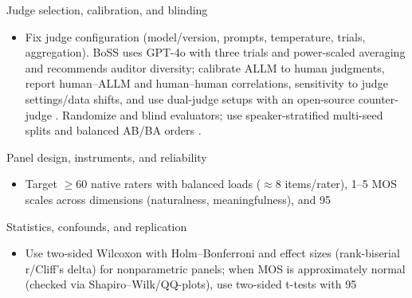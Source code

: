 \documentclass{article}
\begin{document}
Judge selection, calibration, and blinding
\begin{itemize}
  \item Fix judge configuration (model/version, prompts, temperature, trials, aggregation). BoSS uses GPT-4o with three trials and power-scaled averaging and recommends auditor diversity; calibrate ALLM to human judgments, report human--ALLM and human--human correlations, sensitivity to judge settings/data shifts, and use dual-judge setups with an open-source counter-judge \cite{wang2025bossbeyondsemanticspeech}. Randomize and blind evaluators; use speaker-stratified multi-seed splits and balanced AB/BA orders \cite{vashishth2024stabspeechtokenizerassessmentbenchmark,chen2023reducingbarriersselfsupervisedlearninghu}.
\end{itemize}

Panel design, instruments, and reliability
\begin{itemize}
  \item Target $\ge$60 native raters with balanced loads ($\approx$8 items/rater), 1--5 MOS scales across dimensions (naturalness, meaningfulness), and 95%
\end{itemize}

Statistics, confounds, and replication
\begin{itemize}
  \item Use two-sided Wilcoxon with Holm--Bonferroni and effect sizes (rank-biserial r/Cliff's delta) for nonparametric panels; when MOS is approximately normal (checked via Shapiro--Wilk/QQ-plots), use two-sided t-tests with 95%
\end{itemize}
\end{document}
